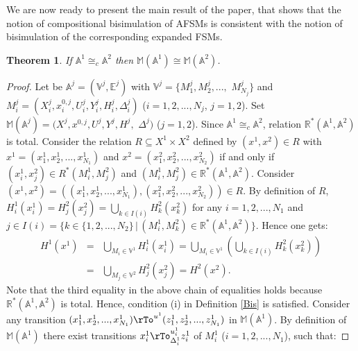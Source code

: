\documentclass{amsart}
\newtheorem{theorem}{Theorem}[section]
\theoremstyle{definition}
\theoremstyle{remark}
\numberwithin{equation}{section}
\begin{document}
We are now ready to present the main result of the paper, that shows that the notion of compositional bisimulation of AFSMs is consistent with the notion of bisimulation of the corresponding expanded FSMs. 
\begin{theorem}\label{prop}
If $\mathbb{A}^{1} \cong_{c} \mathbb{A}^{2}$ then $\mathbb{M}(\mathbb{A}^{1}) \cong \mathbb{M}(\mathbb{A}^{2})$. 
\end{theorem}
\begin{proof}
Let be $\mathbb{A}^{j}=(\mathbb{V}^{j},\mathbb{E}^{j})$ with $\mathbb{V}^{j}=\{M_{1}^{j},M_{2}^{j},...,$ $M_{N_{j}}^{j}\}$ and 
$M_{i}^{j}=(X_{i}^{j},x_{i}^{0,j},U_{i}^{j},Y_{i}^{j},H_{i}^{j},\Delta_{i}^{j})$ ($i=1,2,...,N_{j}$, $j=1,2$). 
Set 
$ 
\mathbb{M}(\mathbb{A}^{j})=(X^{j},x^{0,j},U^{j},Y^{j},H^{j},$ $\Delta^{j}) 
$ ($j=1,2$). Since $\mathbb{A}^{1} \cong_{c} \mathbb{A}^{2}$, relation $\mathbb{R}^{\ast}(\mathbb{A}^{1},\mathbb{A}^{2})$ is total. 
Consider the relation $R\subseteq X^{1}\times X^{2}$ defined by $(x^{1},x^{2})\in R$ with $x^{1}=(x_{1}^{1},x_{2}^{1},...,x_{N_{1}}^{1})$ and $x^{2}=(x^{2}_{1},x^{2}_{2},...,x^{2}_{N_{2}})$ if and only if $(x_{i}^{1},x_{j}^{2})\in R^{\ast}(M_{i}^{1},M_{j}^{2})$ and $(M_{i}^{1},M^{2}_{j})\in \mathbb{R}^{\ast}(\mathbb{A}^{1},\mathbb{A}^{2})$. Consider $
(x^{1},x^{2})=((x_{1}^{1},x_{2}^{1},...,x_{N_{1}}^{1}),(x^{2}_{1},x^{2}_{2},...,x^{2}_{N_{2}}))\in R 
$. 
By definition of $R$, $H_{i}^{1}(x^{1}_{i})=H_{j}^{2}(x^{2}_{j})=\bigcup_{k\in I(i)}H_{k}^{2}(x^{2}_{k})$ for any $i=1,2,...,N_{1}$ and $j\in I(i)=\{k\in \{1,2,...,N_{2}\}\,|\, (M_{i}^{1},M^{2}_{k})\in \mathbb{R}^{\ast}(\mathbb{A}^{1},\mathbb{A}^{2})\}$. Hence one gets:
\begin{equation}
\label{qa1}
\begin{array}
{rcl}
H^{1}(x^{1}) & = & \bigcup_{M_{i}\in \mathbb{V}^{1}}H^{1}_{i}(x^{1}_{i})=\bigcup_{M_{i}\in \mathbb{V}^{1}}(\bigcup_{k\in I(i)}H^{2}_{k}(x^{2}_{k}))\nonumber\\
& = & \bigcup_{M_{j}\in \mathbb{V}^{2}} H^{2}_{j}(x^{2}_{j})=H^{2}(x^{2}).
\end{array}
\end{equation}
Note that the third equality in the above chain of equalities holds because $\mathbb{R}^{\ast}(\mathbb{A}^{1},\mathbb{A}^{2})$ is total.
Hence, condition (i) in Definition \ref{Bis} is satisfied. Consider any transition $
(x_{1}^{1},x_{2}^{1},...,x_{N_{1}}^{1})\rTo^{u^{1}} (z_{1}^{1},z_{2}^{1},...,z_{N_{1}}^{1})
$ in $\mathbb{M}(\mathbb{A}^{1})$. By definition of $\mathbb{M}(\mathbb{A}^{1})$ there exist transitions $x_{i}^{1}\rTo_{\Delta_{i}^{1}}^{u_{i}^{1}} z_{i}^{1}$ of $M_{i}^{1}$ ($i=1,2,...,N_{1}$), such that:

\end{proof}
\end{document}
